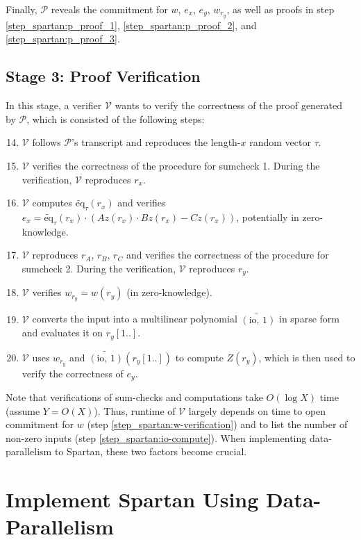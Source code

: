 \documentclass{article}
\renewcommand{\P}{\mathcal{P}}
\newcommand{\V}{\mathcal{V}}
\newcommand{\eq}{\widetilde{\mbox{eq}}}
\newcommand{\io}{\widetilde{(\mbox{io, 1})}}
\begin{document}
Finally, $\P$ reveals the commitment for $w$, $e_x$, $e_y$, $w_{r_y}$, as well as proofs in step \ref{step_spartan:p_proof_1}, \ref{step_spartan:p_proof_2}, and \ref{step_spartan:p_proof_3}.

\subsection{Stage 3: Proof Verification}
In this stage, a verifier $\V$ wants to verify the correctness of the proof generated by $\P$, which is consisted of the following steps:
\begin{enumerate}
    \setcounter{enumi}{13}
    \item $\V$ follows $\P$'s transcript and reproduces the length-$x$ random vector $\tau$.
    \item $\V$ verifies the correctness of the procedure for sumcheck 1. During the verification, $\V$ reproduces $r_x$.
    \item $\V$ computes $\eq_\tau(r_x)$ and verifies $e_x = \eq_\tau(r_x)\cdot (Az(r_x)\cdot Bz(r_x) - Cz(r_x))$, potentially in zero-knowledge.
    \item $\V$ reproduces $r_A$, $r_B$, $r_C$ and verifies the correctness of the procedure for sumcheck 2. During the verification, $\V$ reproduces $r_y$.
    \item $\V$ verifies $w_{r_y} = w(r_y)$ (in zero-knowledge).\label{step_spartan:w-verification}
    \item $\V$ converts the input into a multilinear polynomial $\io$ in sparse form and evaluates it on $r_y[1..]$.\label{step_spartan:io-compute}
    \item $\V$ uses $w_{r_y}$ and $\io(r_y[1..])$ to compute $Z(r_y)$, which is then used to verify the correctness of $e_y$.
\end{enumerate}

Note that verifications of sum-checks and computations take $O(\log X)$ time (assume $Y = O(X)$). Thus, runtime of $\V$ largely depends on time to open commitment for $w$ (step \ref{step_spartan:w-verification}) and to list the number of non-zero inputs (step \ref{step_spartan:io-compute}). When implementing data-parallelism to Spartan, these two factors become crucial.


\section{Implement Spartan Using Data-Parallelism}\label{spartan_parallel}
\end{document}
